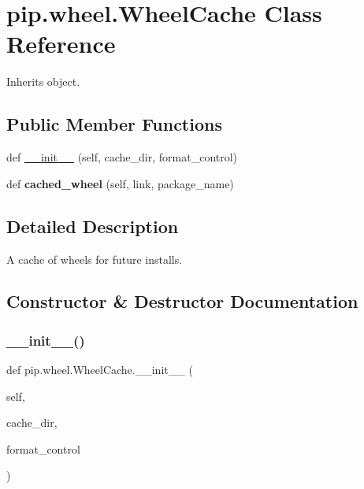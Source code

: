 \hypertarget{classpip_1_1wheel_1_1_wheel_cache}{}\section{pip.\+wheel.\+Wheel\+Cache Class Reference}
\label{classpip_1_1wheel_1_1_wheel_cache}


Inherits object.

\subsection*{Public Member Functions}
\begin{DoxyCompactItemize}
\item 
def \hyperlink{classpip_1_1wheel_1_1_wheel_cache_aaf9ea6855adbe8fe0aa3cbfd5f8b4840}{\+\_\+\+\_\+init\+\_\+\+\_\+} (self, cache\+\_\+dir, format\+\_\+control)
\item 
\mbox{\label{classpip_1_1wheel_1_1_wheel_cache_aa052c945d5376d4a84077cc342d5a738}} 
def {\bfseries cached\+\_\+wheel} (self, link, package\+\_\+name)
\end{DoxyCompactItemize}


\subsection{Detailed Description}
\begin{DoxyVerb}A cache of wheels for future installs.\end{DoxyVerb}
 

\subsection{Constructor \& Destructor Documentation}
\mbox{\label{classpip_1_1wheel_1_1_wheel_cache_aaf9ea6855adbe8fe0aa3cbfd5f8b4840}} 
\subsubsection{\texorpdfstring{\+\_\+\+\_\+init\+\_\+\+\_\+()}{\_\_init\_\_()}}
{\footnotesize\ttfamily def pip.\+wheel.\+Wheel\+Cache.\+\_\+\+\_\+init\+\_\+\+\_\+ (\begin{DoxyParamCaption}\item[{}]{self,  }\item[{}]{cache\+\_\+dir,  }\item[{}]{format\+\_\+control }\end{DoxyParamCaption})}

